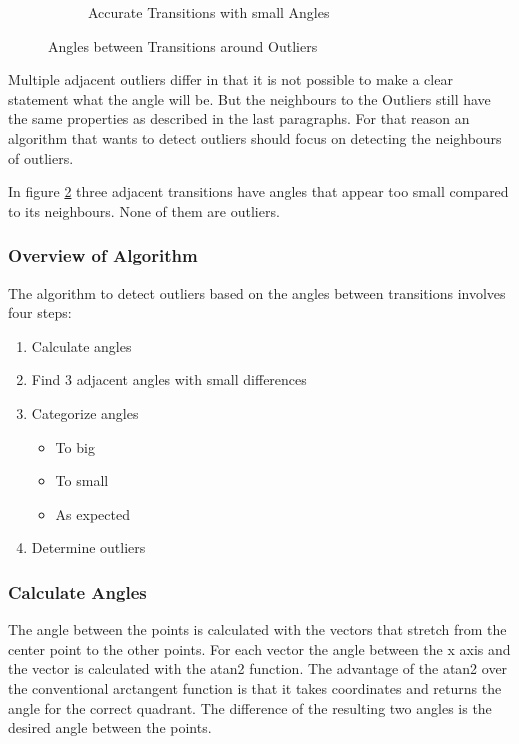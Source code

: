 \begin{figure}[H]
\begin{subfigure}{.33\textwidth}
	\caption{Accurate Transitions  with small Angles}
	\label{fig:nonOutlier}
\end{subfigure}
\caption{Angles between Transitions around Outliers}
\end{figure}

Multiple adjacent outliers differ in that it is not possible to make a clear statement what the angle will be. But the neighbours to the Outliers still have the same properties as described in the last paragraphs. For that reason an algorithm that wants to detect outliers should focus on detecting the neighbours of outliers.

In figure \ref{fig:nonOutlier} three adjacent transitions have angles that appear too small compared to its neighbours. None of them are outliers.

\subsubsection{Overview of Algorithm}
\label{sec:descriptionOfAngleValidation}

The algorithm to detect outliers based on the angles between transitions involves four steps:

\begin{enumerate}
	\item Calculate angles
	\item Find 3 adjacent angles with small differences
	\item Categorize angles
	\begin{itemize}
		\item To big
		\item To small
		\item As expected 
	\end{itemize}
	\item Determine outliers
\end{enumerate}
\subsubsection{Calculate Angles}
\label{sec:calculateAngles}
The angle between the points is calculated with the vectors that stretch from the center point to the other points. For each vector the angle between the x axis and the vector is calculated with the atan2 function. The advantage of the atan2 over the conventional arctangent function is that it takes coordinates and returns the angle for the correct quadrant. The difference of the resulting two angles is the desired angle between the points. 

